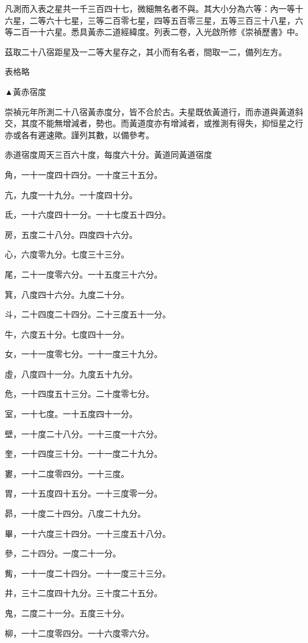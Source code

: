 \begin{pinyinscope}
凡測而入表之星共一千三百四十七，微細無名者不與。其大小分為六等：內一等十六星，二等六十七星，三等二百零七星，四等五百零三星，五等三百三十八星，六等二百一十六星。悉具黃赤二道經緯度。列表二卷，入光啟所修《崇禎歷書》中。

茲取二十八宿距星及一二等大星存之，其小而有名者，間取一二，備列左方。

表格略

▲黃赤宿度

崇禎元年所測二十八宿黃赤度分，皆不合於古。夫星既依黃道行，而赤道與黃道斜交，其度不能無增減者，勢也。而黃道度亦有增減者，或推測有得失，抑恒星之行亦或各有遲速歟。謹列其數，以備參考。

赤道宿度周天三百六十度，每度六十分。黃道同黃道宿度

角，一十一度四十四分。一十度三十五分。

亢，九度一十九分。一十度四十分。

氐，一十六度四十一分。一十七度五十四分。

房，五度二十八分。四度四十六分。

心，六度零九分。七度三十三分。

尾，二十一度零六分。一十五度三十六分。

箕，八度四十六分。九度二十分。

斗，二十四度二十四分。二十三度五十一分。

牛，六度五十分。七度四十一分。

女，一十一度零七分。一十一度三十九分。

虛，八度四十一分。九度五十九分。

危，一十四度五十三分。二十度零七分。

室，一十七度。一十五度四十一分。

壁，一十度二十八分。一十三度一十六分。

奎，一十四度三十分。一十一度二十九分。

婁，一十二度零四分。一十三度。

胃，一十五度四十五分。一十三度零一分。

昴，一十度二十四分。八度二十九分。

畢，一十六度三十四分。一十三度五十八分。

參，二十四分。一度二十一分。

觜，一十一度二十四分。一十一度三十三分。

井，三十二度四十九分。三十度二十五分。

鬼，二度二十一分。五度三十分。

柳，一十二度零四分。一十六度零六分。


\end{pinyinscope}
